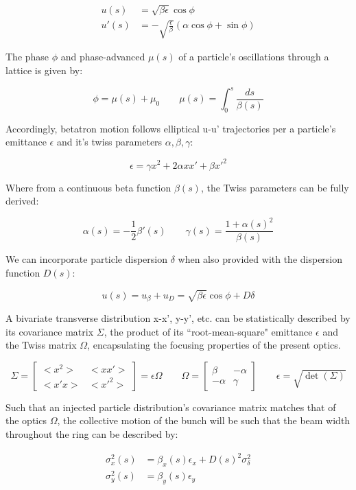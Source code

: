 $$\begin{aligned}
        u(s)  & = \sqrt{\beta\epsilon}\cos\phi                            \\
        u'(s) & = -\sqrt{\frac{\epsilon}{\beta}}(\alpha\cos\phi+\sin\phi)
        \label{eq:hills_equations}
    \end{aligned}$$

The phase $\phi$ and phase-advanced $\mu(s)$ of a particle's oscillations through a lattice is given by:

$$\phi = \mu(s) + \mu_0 \qquad \mu(s) = \int_0^s\frac{ds}{\beta(s)}$$

Accordingly, betatron motion follows elliptical u-u' trajectories per a particle's emittance $\epsilon$ and it's twiss parameters $\alpha, \beta, \gamma$:

$$\epsilon = \gamma x^2 + 2 \alpha x x' + \beta x'^2$$

Where from a continuous beta function $\beta(s)$, the  Twiss parameters can be fully derived:

$$\alpha(s) = -\frac{1}{2}\beta'(s) \qquad \gamma(s) = \frac{1+\alpha(s)^2}{\beta(s)}$$

We can incorporate particle dispersion $\delta$ when also provided with the dispersion function $D(s)$:

$$u(s) = u_\beta + u_D= \sqrt{\beta\epsilon}\cos\phi + D\delta$$

A bivariate transverse distribution x-x', y-y', etc. can be statistically described by its covariance matrix $\Sigma$, the product of its ``root-mean-square" emittance $\epsilon$ and the Twiss matrix $\Omega$, encapsulating the focusing properties of the present optics.

$$\Sigma = \begin{bmatrix}<x^2> & <xx'> \\ <x'x>& <x'^2>\end{bmatrix} = \epsilon\Omega \qquad \Omega = \begin{bmatrix}\beta &-\alpha \\ -\alpha & \gamma\end{bmatrix} \qquad \epsilon = \sqrt{\det(\Sigma)}$$

Such that an injected particle distribution's covariance matrix matches that of the optics $\Omega$, the collective motion of the bunch will be such that the beam width throughout the ring can be described by:

$$\begin{aligned}
        \sigma^2_x(s) & = \beta_x(s)\epsilon_x+D(s)^2\sigma_\delta^2 \\
        \sigma^2_y(s) & = \beta_y(s)\epsilon_y
    \end{aligned}$$

